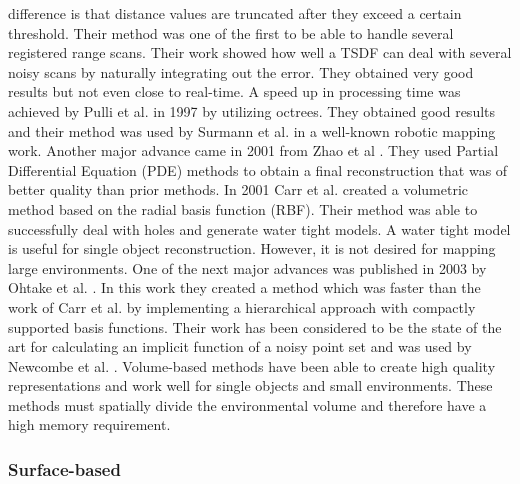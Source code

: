 \documentclass[12pt]{article}
\begin{document}
difference is that distance values are truncated after they exceed a
certain threshold. Their method was one of the first to be able to handle
several registered range scans.  Their work showed how well a TSDF can deal
with several noisy scans by naturally integrating out the error. They
obtained very good results but not even close to real-time. A speed up in
processing time was achieved by Pulli et al. in 1997 \cite{Pulli1997} by
utilizing octrees. They obtained good results and their method was used by
Surmann et al. \cite{Surmann2003} in a well-known robotic mapping work.
Another major advance came in 2001 from Zhao et al \cite{Zhao2001}. They
used Partial Differential Equation (PDE) methods to obtain a final
reconstruction that was of better quality than prior methods. In 2001 Carr
et al. \cite{Carr2001} created a volumetric method based on the radial
basis function (RBF). Their method was able to successfully deal with holes
and generate water tight models. A water tight model is useful for single
object reconstruction. However, it is not desired for mapping large
environments. One of the next major advances was published in 2003 by
Ohtake et al. \cite{Ohtake2003}. In this work they created a method which
was faster than the work of Carr et al.  \cite{Carr2001} by implementing a
hierarchical approach with compactly supported basis functions. Their work
has been considered to be the state of the art for calculating an implicit
function of a noisy point set and was used by Newcombe et al.
\cite{Newcombe2010}. Volume-based methods have been able to create high
quality representations and work well for single objects and small
environments. These methods must spatially divide the environmental volume
and therefore have a high memory requirement. 

\subsubsection{Surface-based} 
\end{document}
